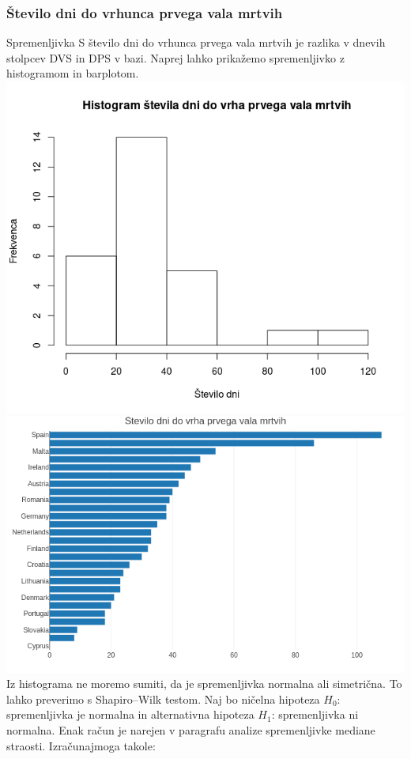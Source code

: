 \documentclass[a4paper,11pt]{article}
\begin{document}
\subsubsection{Število dni do vrhunca prvega vala mrtvih}
Spremenljivka S število dni do vrhunca prvega vala mrtvih je razlika v dnevih stolpcev DVS in DPS v bazi. Naprej lahko prikažemo spremenljivko z histogramom in barplotom.
\includegraphics[scale=0.6]{histogram_st_dni_do_peaka_mrtvih}
\includegraphics[scale=0.6]{barplot_st_dni_do_peaka_mrtvih}
Iz histograma ne moremo sumiti, da je spremenljivka normalna ali simetrična. To lahko preverimo s Shapiro–Wilk testom. Naj bo ničelna hipoteza \(H_0\): spremenljivka je normalna in alternativna hipoteza \(H_1\): spremenljivka ni normalna. Enak račun je narejen v paragrafu analize spremenljivke mediane straosti. Izračunajmoga takole:
\end{document}
